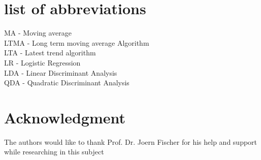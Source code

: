 \documentclass[conference]{IEEEtran}
\begin{document}
%


\appendix
\section*{list of abbreviations}
MA - Moving average
\\
LTMA - Long term moving average Algorithm
\\
LTA - Latest trend algorithm
\\
LR - Logistic Regression
\\
LDA - Linear Discriminant Analysis
\\
QDA - Quadratic Discriminant Analysis

\section*{Acknowledgment}

The authors would like to thank Prof. Dr. Joern Fischer for his help and support while researching in this subject




\ifCLASSOPTIONcaptionsoff
  \newpage
\fi




\end{document}
